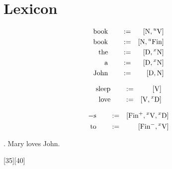 \documentclass{article}
\begin{document}
\section{Lexicon}

\begin{glexicon}[nominal]
\begin{align}
\syndef{book}{[N,\un{V}]}\\
\syndef{book}{[N,\un{Fin}]}\\
\syndef{the}{[D,\ux{N}]}\\
\syndef{a}{[D,\ux{N}]}\\
\syndef{John}{[D,N]}
\end{align}
\end{glexicon}


\begin{glexicon}[verbal]
\begin{align}
\syndef{sleep}{[V]}\\
\syndef{love}{[V,\ux{D}]}\\
\end{align}
\end{glexicon}

\begin{glexicon}[functional]
\begin{align}
				\syndef{-s}{[Fin^+,\ux{V},\ux{D}]}\\
	      \syndef{to}{[Fin^-,\ux{V}]}\\
\end{align}
\end{glexicon}


\ex. Mary loves John.

[35][40]
\end{document}
